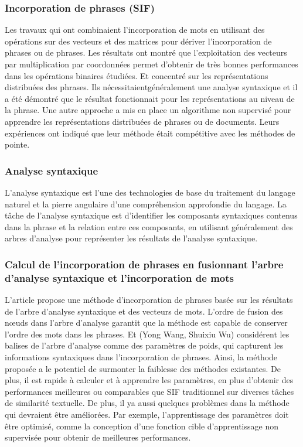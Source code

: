 \documentclass[12pt]{report}
\begin{document}
\subsubsection{Incorporation de phrases (SIF)}

Les travaux qui ont combinaient l'incorporation de mots en utilisant des
opérations sur des vecteurs et des matrices pour dériver l'incorporation de
phrases ou de phrases. Les résultats ont montré que l'exploitation des
vecteurs par multiplication par coordonnées permet d'obtenir de très
bonnes performances dans les opérations binaires étudiées. Et concentré
sur les représentations distribuées des phrases. Ils nécessitaientgénéralement une analyse syntaxique et il a été démontré que le résultat
fonctionnait pour les représentations au niveau de la phrase. Une autre
approche a mis en place un algorithme non supervisé pour apprendre les
représentations distribuées de phrases ou de documents. Leurs expériences
ont indiqué que leur méthode était compétitive avec les méthodes de
pointe\cite{57}.

\subsubsection{Analyse syntaxique}

L'analyse syntaxique est l'une des technologies de base du traitement du
langage naturel et la pierre angulaire d'une compréhension approfondie du
langage. La tâche de l'analyse syntaxique est d'identifier les composants
syntaxiques contenus dans la phrase et la relation entre ces composants, en
utilisant généralement des arbres d'analyse pour représenter les résultats de
l'analyse syntaxique\cite{58}.
\subsubsection{Calcul de l'incorporation de phrases en fusionnant l'arbre d'analyse syntaxique et l'incorporation de mots}

L'article propose une méthode d'incorporation de phrases basée sur les
résultats de l'arbre d'analyse syntaxique et des vecteurs de mots. L'ordre de
fusion des nœuds dans l'arbre d'analyse garantit que la méthode est capable
de conserver l'ordre des mots dans les phrases. Et (Yong Wang, Shuixiu
Wu) considérent les balises de l'arbre d'analyse comme des paramètres de
poids, qui capturent les informations syntaxiques dans l'incorporation de
phrases. Ainsi, la méthode proposée a le potentiel de surmonter la faiblesse
des méthodes existantes. De plus, il est rapide à calculer et à apprendre les
paramètres, en plus d'obtenir des performances meilleures ou comparables
que SIF traditionnel sur diverses tâches de similarité textuelle. De plus, il ya aussi quelques problèmes dans la méthode qui devraient être améliorées.
Par exemple, l'apprentissage des paramètres doit être optimisé, comme la
conception d'une fonction cible d'apprentissage non supervisée pour
obtenir de meilleures performances\cite{59}.
\end{document}
